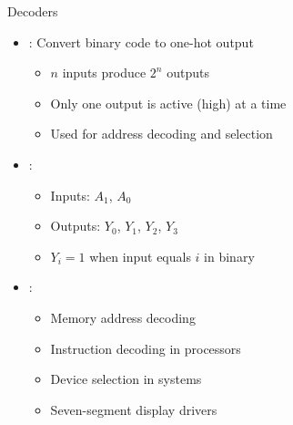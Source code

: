 \begin{frame}{Decoders}
\begin{itemize}
\item {}: Convert binary code to one-hot output
\begin{itemize}
\item $n$ inputs produce $2^n$ outputs
\item Only one output is active (high) at a time
\item Used for address decoding and selection
\end{itemize}
\vspace{0.5cm}
\item {}:
\begin{itemize}
\item Inputs: $A_1$, $A_0$
\item Outputs: $Y_0$, $Y_1$, $Y_2$, $Y_3$
\item $Y_i = 1$ when input equals $i$ in binary
\end{itemize}
\vspace{0.3cm}
\item {}:
\begin{itemize}
\item Memory address decoding
\item Instruction decoding in processors
\item Device selection in systems
\item Seven-segment display drivers
\end{itemize}
\end{itemize}
\end{frame}

